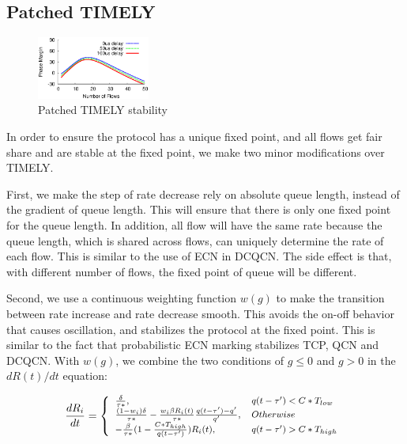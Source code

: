 \subsection {Patched TIMELY}
\begin{figure}[t]
\center
\includegraphics[width=0.33\textwidth]{figures/timely_stability.eps}
\caption{Patched TIMELY stability}
\label{fig:timely_stability}
\end{figure}

In order to ensure the protocol has a unique fixed point, and all flows get fair
share and are stable at the fixed point, we make two minor modifications over
TIMELY.

First, we make the step of rate decrease rely on absolute queue length, instead
of the gradient of queue length.  This will ensure that there is only one fixed
point for the queue length. In addition, all flow will have the same rate
because the queue length, which is shared across flows, can uniquely determine
the rate of each flow. This is similar to the use of ECN in DCQCN. The side
effect is that, with different number of flows, the fixed point of queue will be
different.

Second, we use a continuous weighting function $w(g)$ to make the transition
between rate increase and rate decrease smooth. This avoids the on-off behavior
that causes oscillation, and stabilizes the protocol at the fixed point.  This
is similar to the fact that probabilistic ECN marking stabilizes TCP, QCN and
DCQCN. With $w(g)$, we combine the two conditions of $g \le 0$ and $g>0$ in the
$dR(t)/dt$ equation:


\begin{equation}
\small
\frac{{dR_i}}{{dt}} = \left\{ \begin{array}{ll}
\frac{\delta }{{\tau *}}, & q(t - \tau ') < C*{T_{low}}\\
\frac{{(1 - {w_i})\delta }}{{\tau *}} - \frac{{{w_i}\beta {R_i}(t)}}{{\tau *}}\frac{{q(t - \tau ') - q'}}{{q'}}, & Otherwise\\
 - \frac{\beta }{{\tau *}}(1 - \frac{{C*{T_{high}}}}{{q(t - \tau ')}})R_i(t), & q(t - \tau ') > C*{T_{high}}
\end{array} \right.\\
\label{eq:timely_fixed}
\end{equation}

